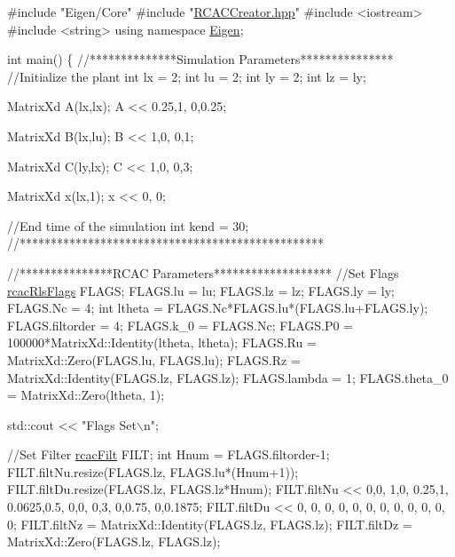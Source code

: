 \begin{DoxyCode}
\textcolor{preprocessor}{#include "Eigen/Core"}
\textcolor{preprocessor}{#include "\hyperlink{_r_c_a_c_creator_8hpp}{RCACCreator.hpp}"}
\textcolor{preprocessor}{#include <iostream>}
\textcolor{preprocessor}{#include <string>}
\textcolor{keyword}{using namespace }\hyperlink{namespace_eigen}{Eigen};

\textcolor{keywordtype}{int} main()
\{
    \textcolor{comment}{//**************Simulation Parameters***************}
    \textcolor{comment}{//Initialize the plant}
    \textcolor{keywordtype}{int} lx = 2;
    \textcolor{keywordtype}{int} lu = 2;
    \textcolor{keywordtype}{int} ly = 2;
    \textcolor{keywordtype}{int} lz = ly;

    MatrixXd A(lx,lx);
    A << 0.25,1,
          0,0.25;

    MatrixXd B(lx,lu);
    B << 1,0,
         0,1;

    MatrixXd C(ly,lx);
    C << 1,0,
         0,3;

    MatrixXd x(lx,1);
    x << 0,
         0;

    \textcolor{comment}{//End time of the simulation}
    \textcolor{keywordtype}{int} kend = 30;
    \textcolor{comment}{//*************************************************}


    \textcolor{comment}{//***************RCAC Parameters*******************}
    \textcolor{comment}{//Set Flags}
    \hyperlink{structrcac_rls_flags}{rcacRlsFlags} FLAGS;
    FLAGS.lu = lu;
    FLAGS.lz = lz;
    FLAGS.ly = ly;
    FLAGS.Nc = 4;
    \textcolor{keywordtype}{int} ltheta = FLAGS.Nc*FLAGS.lu*(FLAGS.lu+FLAGS.ly);
    FLAGS.filtorder = 4;
    FLAGS.k\_0 = FLAGS.Nc;
    FLAGS.P0 = 100000*MatrixXd::Identity(ltheta, ltheta);
    FLAGS.Ru = MatrixXd::Zero(FLAGS.lu, FLAGS.lu);
    FLAGS.Rz = MatrixXd::Identity(FLAGS.lz, FLAGS.lz);
    FLAGS.lambda = 1;
    FLAGS.theta\_0 = MatrixXd::Zero(ltheta, 1);

    std::cout << \textcolor{stringliteral}{"Flags Set\(\backslash\)n"}; 

    \textcolor{comment}{//Set Filter}
    \hyperlink{structrcac_filt}{rcacFilt} FILT;
    \textcolor{keywordtype}{int} Hnum = FLAGS.filtorder-1;
    FILT.filtNu.resize(FLAGS.lz, FLAGS.lu*(Hnum+1));
    FILT.filtDu.resize(FLAGS.lz, FLAGS.lz*Hnum);
    FILT.filtNu << 0,0, 1,0, 0.25,1, 0.0625,0.5,
                   0,0, 0,3, 0,0.75, 0,0.1875; 
    FILT.filtDu << 0, 0, 0, 0, 0, 0,
                   0, 0, 0, 0, 0, 0;
    FILT.filtNz = MatrixXd::Identity(FLAGS.lz, FLAGS.lz);
    FILT.filtDz =  MatrixXd::Zero(FLAGS.lz, FLAGS.lz);


\end{DoxyCode}
